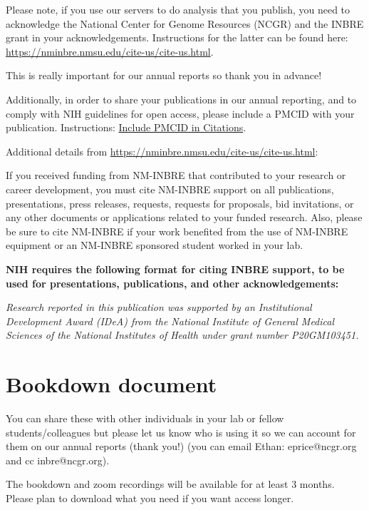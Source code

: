 \documentclass[
]{book}
\begin{document}
Please note, if you use our servers to do analysis that you publish, you need to acknowledge the National Center for Genome Resources (NCGR) and the INBRE grant in your acknowledgements. Instructions for the latter can be found here: \url{https://nminbre.nmsu.edu/cite-us/cite-us.html}.

This is really important for our annual reports so thank you in advance!

Additionally, in order to share your publications in our annual reporting, and to comply with NIH guidelines for open access, please include a PMCID with your publication. Instructions: \href{https://publicaccess.nih.gov/include-pmcid-citations.htm}{Include PMCID in Citations}.

Additional details from \url{https://nminbre.nmsu.edu/cite-us/cite-us.html}:

{If you received funding from NM-INBRE that contributed to your research or career development, you must cite NM-INBRE support on all publications, presentations, press releases, requests, requests for proposals, bid invitations, or any other documents or applications related to your funded research. Also, please be sure to cite NM-INBRE if your work benefited from the use of NM-INBRE equipment or an NM-INBRE sponsored student worked in your lab.}

{\textbf{NIH requires the following format for citing INBRE support, to be used for presentations, publications, and other acknowledgements:}}

{\emph{Research reported in this publication was supported by an Institutional Development Award (IDeA) from the National Institute of General Medical Sciences of the National Institutes of Health under grant number P20GM103451.}}

\hypertarget{bookdown-document}{%
\chapter*{Bookdown document}\label{bookdown-document}}

You can share these with other individuals in your lab or fellow students/colleagues but please let us know who is using it so we can account for them on our annual reports (thank you!) (you can email Ethan: eprice@ncgr.org and cc inbre@ncgr.org).

The bookdown and zoom recordings will be available for at least 3 months. Please plan to download what you need if you want access longer.
\end{document}
